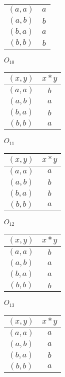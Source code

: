 \documentclass[12pt]{article}
\begin{document}
\begin{enumerate}
\begin{minipage}[h]{.25\textwidth}
\begin{tabular}{ c | c }
        	\hline
        	$(a,a)$ & $a$ \\
        	$(a,b)$ & $b$ \\
        	$(b,a)$ & $a$ \\
        	$(b,b)$ & $b$
      	\end{tabular}
    	\end{minipage}
    	\bigskip  	
    	\begin{minipage}[h]{.25\textwidth}
				$O_{10}$
    		\begin{tabular}{ c | c }
      		$(x,y)$ & $x*y$ \\
        	\hline
        	$(a,a)$ & $b$ \\
        	$(a,b)$ & $a$ \\
        	$(b,a)$ & $b$ \\
        	$(b,b)$ & $a$
      	\end{tabular}
    	\end{minipage}   
    	\begin{minipage}[h]{.25\textwidth}
				$O_{11}$
    		\begin{tabular}{ c | c }
      		$(x,y)$ & $x*y$ \\
        	\hline
        	$(a,a)$ & $a$ \\
        	$(a,b)$ & $b$ \\
        	$(b,a)$ & $b$ \\
        	$(b,b)$ & $a$
      	\end{tabular}
    	\end{minipage}   
    	\begin{minipage}[h]{.25\textwidth}
				$O_{12}$
    		\begin{tabular}{ c | c }
      		$(x,y)$ & $x*y$ \\
        	\hline
        	$(a,a)$ & $b$ \\
        	$(a,b)$ & $a$ \\
        	$(b,a)$ & $a$ \\
        	$(b,b)$ & $b$
      	\end{tabular}
    	\end{minipage}
    	\begin{minipage}[h]{.25\textwidth}
				$O_{13}$
    		\begin{tabular}{ c | c }
      		$(x,y)$ & $x*y$ \\
        	\hline
        	$(a,a)$ & $a$ \\
        	$(a,b)$ & $a$ \\
        	$(b,a)$ & $b$ \\
        	$(b,b)$ & $a$

\end{tabular}
\end{minipage}
\end{enumerate}
\end{document}
